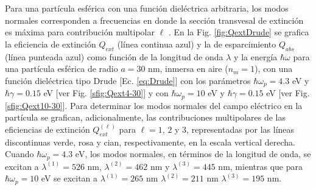 Para una partícula esférica con una función dieléctrica arbitraria, los modos normales corresponden a frecuencias en donde la sección transvesal de extinción es máxima para contribución multipolar $\ell$ \cite{kreibig1995clusters}. En la Fig. \ref{fig:QextDrude} se grafica la eficiencia de extinción $Q_{ext}$ (línea continua azul) y la de esparcimiento $Q_{abs}$ (línea punteada azul) como función de la longitud de onda $\lambda$ y la energía $\hbar\omega$ para una partícula esférica de radio $a=30$ nm, inmersa en aire ($n_m=1$), con una función dieléctrica tipo Drude [Ec. \eqref{eq:Drude}] con los parámetros $\hbar\omega_p=4.3$ eV y $\hbar\gamma = 0.15$ eV [ver Fig. \ref{sfig:Qext4-30}] y con $\hbar\omega_p=10$ eV y $\hbar\gamma = 0.15$ eV [ver Fig. \ref{sfig:Qext10-30}].  Para determinar los modos normales del campo eléctrico en la partícula se grafican, adicionalmente, las contribuciones multipolares de las eficiencias de extinción $Q_{ext}^{(\ell)}$ para $\ell = 1,\,2$ y $3$, representadas por las líneas discontinuas verde, rosa y cian, respectivamente, en la escala vertical derecha. Cuando $\hbar\omega_p = 4.3$ eV, los modos normales, en términos de la longitud de onda, se excitan a $\lambda^{(1)}= 526$ nm, $\lambda^{(2)}= 462$ nm y $\lambda^{(3)}= 445 $ nm, mientras que para $\hbar\omega_p = 10$ eV se excitan a $\lambda^{(1)}= 265$ nm $\lambda^{(2)}= 211$ nm $\lambda^{(3)}= 195$ nm.

